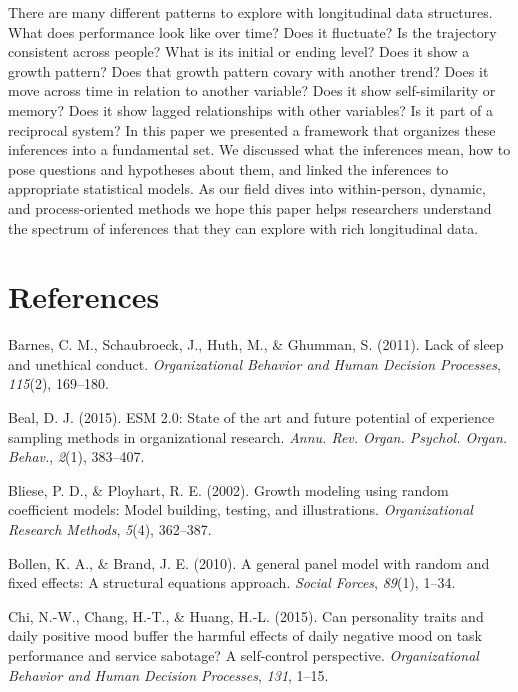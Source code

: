 \documentclass[english,,man]{apa6}
\theoremstyle{definition}
\theoremstyle{definition}
\theoremstyle{definition}
\theoremstyle{remark}
\begin{document}
There are many different patterns to explore with longitudinal data
structures. What does performance look like over time? Does it
fluctuate? Is the trajectory consistent across people? What is its
initial or ending level? Does it show a growth pattern? Does that growth
pattern covary with another trend? Does it move across time in relation
to another variable? Does it show self-similarity or memory? Does it
show lagged relationships with other variables? Is it part of a
reciprocal system? In this paper we presented a framework that organizes
these inferences into a fundamental set. We discussed what the
inferences mean, how to pose questions and hypotheses about them, and
linked the inferences to appropriate statistical models. As our field
dives into within-person, dynamic, and process-oriented methods we hope
this paper helps researchers understand the spectrum of inferences that
they can explore with rich longitudinal data.

\newpage

\hypertarget{references}{%
\section{References}\label{references}}

\setlength{\parindent}{-0.5in}
\setlength{\leftskip}{0.5in}

\hypertarget{refs}{}
\leavevmode\hypertarget{ref-barnes_lack_2011}{}%
Barnes, C. M., Schaubroeck, J., Huth, M., \& Ghumman, S. (2011). Lack of
sleep and unethical conduct. \emph{Organizational Behavior and Human
Decision Processes}, \emph{115}(2), 169--180.

\leavevmode\hypertarget{ref-beal_esm_2015}{}%
Beal, D. J. (2015). ESM 2.0: State of the art and future potential of
experience sampling methods in organizational research. \emph{Annu. Rev.
Organ. Psychol. Organ. Behav.}, \emph{2}(1), 383--407.

\leavevmode\hypertarget{ref-bliese_growth_2002}{}%
Bliese, P. D., \& Ployhart, R. E. (2002). Growth modeling using random
coefficient models: Model building, testing, and illustrations.
\emph{Organizational Research Methods}, \emph{5}(4), 362--387.

\leavevmode\hypertarget{ref-bollen_general_2010}{}%
Bollen, K. A., \& Brand, J. E. (2010). A general panel model with random
and fixed effects: A structural equations approach. \emph{Social
Forces}, \emph{89}(1), 1--34.

\leavevmode\hypertarget{ref-chi_can_2015}{}%
Chi, N.-W., Chang, H.-T., \& Huang, H.-L. (2015). Can personality traits
and daily positive mood buffer the harmful effects of daily negative
mood on task performance and service sabotage? A self-control
perspective. \emph{Organizational Behavior and Human Decision
Processes}, \emph{131}, 1--15.
\end{document}
